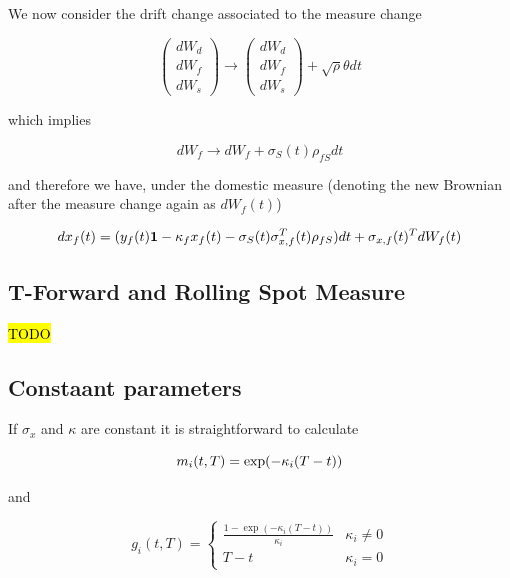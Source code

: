 \documentclass{amsart}
\theoremstyle{plain}
\numberwithin{equation}{section}
\begin{document}
We now consider the drift change associated to the measure change

\begin{equation}
  \begin{pmatrix}
    dW_d \\
    dW_f \\
    dW_s
  \end{pmatrix} \rightarrow
  \begin{pmatrix}
    dW_d \\
    dW_f \\
    dW_s  
  \end{pmatrix} + \sqrt{\rho} \theta dt
\end{equation}


which implies

\begin{equation}
dW_f \rightarrow dW_f + \sigma_S(t) \rho_{fS} dt
\end{equation}

and therefore we have, under the domestic measure (denoting the new Brownian after the measure change again as $dW_f(t)$)

\begin{equation}
  dx_f(t) = (y_f(t)  {\bf 1} - \kappa_f x_f(t) - \sigma_S(t) \sigma_{x,f}^T(t) \rho_{fS} ) dt + \sigma_{x,f}(t)^T dW_f(t)
\end{equation}

\subsection{T-Forward and Rolling Spot Measure}

\hl{TODO}

\subsection{Constaant parameters}

If $\sigma_x$ and $\kappa$ are constant it is straightforward to calculate

\begin{equation}
  m_i(t,T) = \exp ( -\kappa_i (T-t) ) \\
\end{equation}

and

\begin{equation}
  g_i(t,T) = \begin{cases}
    \frac{1 - \exp ( -\kappa_i (T-t) )}{\kappa_i} & \kappa_i \neq 0 \\
    T-t & \kappa_i = 0
  \end{cases}
\end{equation}
\end{document}
